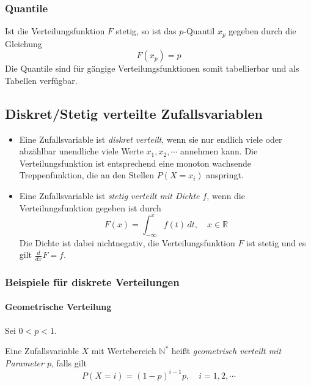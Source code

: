 \documentclass[a4paper, 11pt, accentcolor = tud3b]{tudreport}
\newcommand{\R}{\ensuremath{\mathbb{R}}}
\newcommand{\N}{\ensuremath{\mathbb{N}}}
\begin{document}
                \subsubsection{Quantile}
                    Ist die Verteilungsfunktion \(F\) stetig, so ist das \(p\)-Quantil \(x_p\) gegeben durch die Gleichung
                    \begin{equation*}
	                    F(x_p) = p
                    \end{equation*}
                    Die Quantile sind für gängige Verteilungsfunktionen somit tabellierbar und als Tabellen verfügbar.

            \subsection{Diskret/Stetig verteilte Zufallsvariablen}
                \begin{itemize}
                	\item Eine Zufallsvariable ist \textit{diskret verteilt}, wenn sie nur endlich viele oder abzählbar unendliche viele Werte \( x_1, x_2, \cdots \) annehmen kann. Die Verteilungsfunktion ist entsprechend eine monoton wachsende Treppenfunktion, die an den Stellen \( P(X = x_i) \) anspringt.
                	\item Eine Zufallsvariable ist \textit{stetig verteilt mit Dichte \(f\)}, wenn die Verteilungsfunktion gegeben ist durch
	                	\begin{equation*}
		                	F(x) = \int_{-\infty}^{x} \! f(t) \, dt, \quad x \in \R
	                	\end{equation*}
	                	Die Dichte ist dabei nichtnegativ, die Verteilungsfunktion \(F\) ist stetig und es gilt \( \frac{d}{dx} F = f \).
                \end{itemize}

                \subsubsection{Beispiele für diskrete Verteilungen}
                    \paragraph{Geometrische Verteilung}
	                    Sei \( 0 < p < 1 \).
	                    
	                    Eine Zufallsvariable \(X\) mit Wertebereich \( \N^* \) heißt \textit{geometrisch verteilt mit Parameter \(p\)}, falls gilt
	                    \begin{equation*}
		                    P(X = i) = (1 - p) ^ { i - 1 } p, \quad i = 1, 2, \cdots
	                    \end{equation*}
	                    
\end{document}
